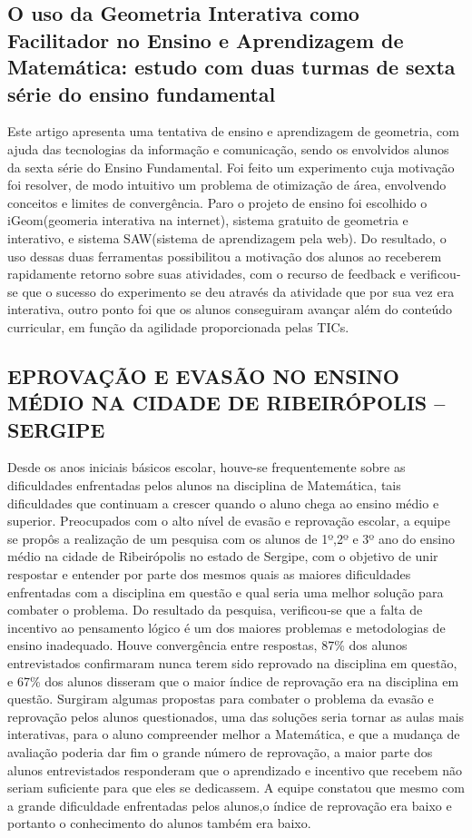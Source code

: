 \documentclass[12pt,a4paper]{article}
\begin{document}
\subsection{O uso da Geometria Interativa como Facilitador no Ensino e Aprendizagem de Matemática: 
estudo com duas turmas de sexta série do ensino fundamental}

Este artigo apresenta uma tentativa de ensino e aprendizagem de geometria, com ajuda das tecnologias da informação e comunicação, sendo os envolvidos alunos da sexta série do Ensino Fundamental. 
Foi feito um experimento cuja motivação foi resolver, de modo intuitivo um problema de otimização de área, envolvendo conceitos e limites de convergência. Paro o projeto de ensino foi escolhido o iGeom(geomeria interativa na internet), sistema gratuito de geometria e interativo, e sistema SAW(sistema de aprendizagem pela web).
Do resultado, o uso dessas duas ferramentas possibilitou a motivação dos alunos ao receberem rapidamente retorno sobre suas atividades, com o recurso de feedback e verificou-se que o sucesso do experimento se deu através da atividade que por sua vez era interativa, outro ponto foi que os alunos conseguiram avançar além do conteúdo curricular, em função da agilidade proporcionada pelas TICs. 

\subsection{EPROVAÇÃO E EVASÃO NO ENSINO MÉDIO NA CIDADE DE  RIBEIRÓPOLIS – SERGIPE}
Desde os anos iniciais básicos escolar, houve-se frequentemente sobre as dificuldades enfrentadas pelos alunos na disciplina de Matemática, tais dificuldades que continuam a crescer quando o aluno chega ao ensino médio e superior. Preocupados com o alto nível de evasão e reprovação escolar, a equipe se propôs a realização de um pesquisa com os alunos de 1º,2º e 3º ano do ensino médio na cidade de Ribeirópolis no estado de Sergipe, com o objetivo de unir respostar e entender por parte dos mesmos quais as maiores dificuldades enfrentadas com a disciplina em questão e qual seria uma melhor solução para combater o problema.
Do resultado da pesquisa, verificou-se que a falta de incentivo ao pensamento lógico é um dos maiores problemas e metodologias de ensino inadequado. Houve convergência entre respostas, 87\% dos alunos entrevistados confirmaram nunca terem sido reprovado na disciplina em questão, e 67\% dos alunos disseram que o maior índice de reprovação era na disciplina em questão. 
Surgiram algumas propostas para combater o problema da evasão e reprovação pelos alunos questionados, uma das soluções seria tornar as aulas mais interativas, para o aluno compreender melhor a Matemática, e que a mudança de avaliação poderia dar fim o grande número de reprovação, a maior parte dos alunos entrevistados responderam que o aprendizado e incentivo que recebem não seriam suficiente para que eles se dedicassem. 
A equipe constatou que mesmo com a grande dificuldade enfrentadas pelos alunos,o índice de reprovação era baixo e portanto o conhecimento do alunos também era baixo.
\end{document}
